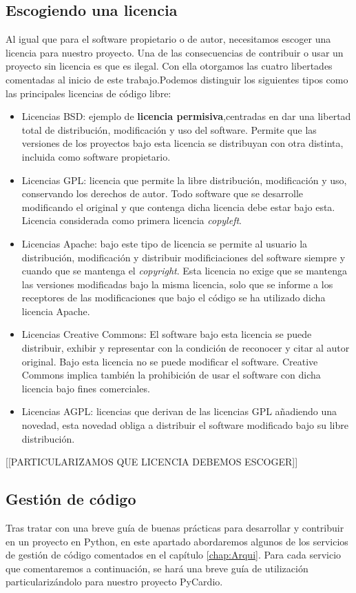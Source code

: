 \subsection*{Escogiendo una licencia}
Al igual que para el software propietario o de autor, necesitamos escoger una licencia para nuestro proyecto. Una de las consecuencias de contribuir o usar un proyecto sin licencia es que es ilegal. Con ella otorgamos las cuatro libertades comentadas al inicio de este trabajo.Podemos distinguir los siguientes tipos como las principales licencias de código libre:
\begin{itemize}
    \item Licencias BSD: ejemplo de \textbf{licencia permisiva},centradas en dar una libertad total de distribución, modificación y uso del software. Permite que las versiones de los proyectos bajo esta licencia se distribuyan con otra distinta, incluida como software propietario.
    \item Licencias GPL: licencia que permite la libre distribución, modificación y uso, conservando los derechos de autor. Todo software que se desarrolle modificando el original y que contenga dicha licencia debe estar bajo esta. Licencia considerada como primera licencia \textit{copyleft}.
    \item Licencias Apache: bajo este tipo de licencia se permite al usuario la distribución, modificación y distribuir modificiaciones del software siempre y cuando que se mantenga el \emph{copyright}. Esta licencia no exige que se mantenga las versiones modificadas bajo la misma licencia, solo que se informe a los receptores de las modificaciones que bajo el código se ha utilizado dicha licencia Apache.
    \item Licencias Creative Commons: El software bajo esta licencia se puede distribuir, exhibir y representar con la condición de reconocer y citar al autor original. Bajo esta licencia no se puede modificar el software. Creative Commons implica también la prohibición de usar el software con dicha licencia bajo fines comerciales. 
    \item Licencias AGPL: licencias que derivan de las licencias GPL añadiendo una novedad, esta novedad obliga a distribuir el software modificado bajo su libre distribución.
\end{itemize}

[[PARTICULARIZAMOS QUE LICENCIA DEBEMOS ESCOGER]]

\subsection{Gestión de código}
\label{subsec:}
Tras tratar con una breve guía de buenas prácticas para desarrollar y contribuir en un proyecto en Python, en este apartado abordaremos algunos de los servicios de gestión de código comentados en el capítulo \ref{chap:Arqui}. Para cada servicio que comentaremos a continuación, se hará una breve guía de utilización particularizándolo para nuestro proyecto PyCardio.

